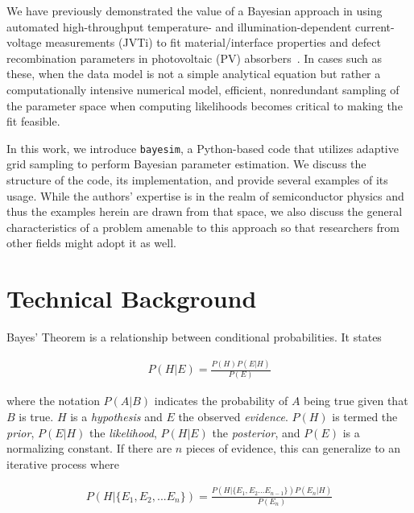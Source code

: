 \documentclass[aps,prl,amsmath,amssymb,superscriptaddress,notitlepage,groupedaddress]{revtex4-1}
\begin{document}
  We have previously demonstrated the value of a Bayesian approach in using automated high-throughput temperature- and illumination-dependent current-voltage measurements (JVTi) to fit material/interface properties and defect recombination parameters in photovoltaic (PV) absorbers~\cite{SnSJoule,FeBayes}. In cases such as these, when the data model is not a simple analytical equation but rather a computationally intensive numerical model, efficient, nonredundant sampling of the parameter space when computing likelihoods becomes critical to making the fit feasible.

  In this work, we introduce \texttt{bayesim}, a Python-based code that utilizes adaptive grid sampling to perform Bayesian parameter estimation. We discuss the structure of the code, its implementation, and provide several examples of its usage. While the authors' expertise is in the realm of semiconductor physics and thus the examples herein are drawn from that space, we also discuss the general characteristics of a problem amenable to this approach so that researchers from other fields might adopt it as well.

\section*{Technical Background}

 Bayes' Theorem is a relationship between conditional probabilities. It states

 \begin{equation}
   \begin{split}
     \label{Eq:1001}
     P(H|E)=\frac{P(H)P(E|H)}{P(E)}
   \end{split}
 \end{equation}

 where the notation $P(A|B)$ indicates the probability of $A$ being true given that $B$ is true. $H$ is a \textit{hypothesis} and $E$ the observed \textit{evidence}. $P(H)$ is termed the \textit{prior}, $P(E|H)$ the \textit{likelihood}, $P(H|E)$ the \textit{posterior}, and $P(E)$ is a normalizing constant. If there are $n$ pieces of evidence, this can generalize to an iterative process where

 \begin{equation}
   \begin{split}
     \label{Eq:2}
     P(H|\{E_1,E_2,...E_n\}) = \frac{P(H|\{E_1,E_2...E_{n-1}\})P(E_n|H)}{P(E_n)}
   \end{split}
 \end{equation}
\end{document}
